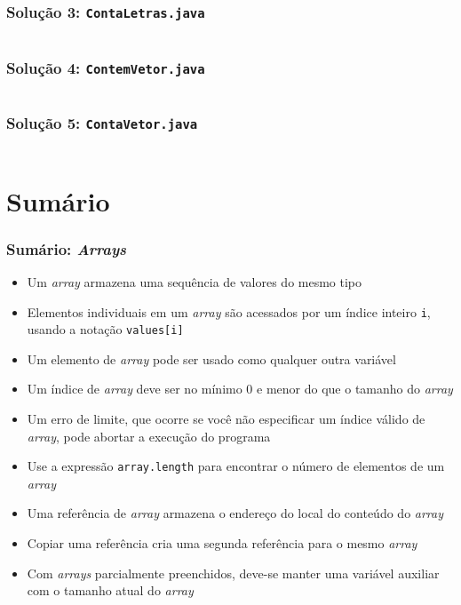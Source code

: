 \documentclass[xcolor={dvipsnames,table},aspectratio=169]{beamer}
\begin{document}
\begin{frame}[fragile]\frametitle{Solução 3: \texttt{ContaLetras.java}}
\tiny{\inputminted[bgcolor=cyan!10]{java}{src/ContaLetras.java}}
\end{frame}

\begin{frame}[fragile]\frametitle{Solução 4: \texttt{ContemVetor.java}}
\tiny{\inputminted[bgcolor=cyan!10]{java}{src/ContemVetor.java}}
\end{frame}

\begin{frame}[fragile]\frametitle{Solução 5: \texttt{ContaVetor.java}}
\tiny{\inputminted[bgcolor=cyan!10]{java}{src/ContaVetor.java}}
\end{frame}

\section{Sumário}

\begin{frame}\frametitle{Sumário: \emph{Arrays}}
\begin{itemize}
	\item Um \emph{array} armazena uma sequência de valores do mesmo tipo
	\item Elementos individuais em um \emph{array} são acessados por um índice inteiro \texttt{i}, usando a notação \texttt{values[i]}
	\item Um elemento de \emph{array} pode ser usado como qualquer outra variável
	\item Um índice de \emph{array} deve ser no mínimo 0 e menor do que o tamanho do \emph{array}
	\item Um erro de limite, que ocorre se você não especificar um índice válido de \emph{array}, pode abortar a execução do programa
	\item Use a expressão \texttt{array.length} para encontrar o número de elementos de um \emph{array}
	\item Uma referência de \emph{array} armazena o endereço do local do conteúdo do \emph{array}
	\item Copiar uma referência cria uma segunda referência para o mesmo \emph{array}
	\item Com \emph{arrays} parcialmente preenchidos, deve-se manter uma variável auxiliar com o tamanho atual do \emph{array}
\end{itemize}
\end{frame}
\end{document}
